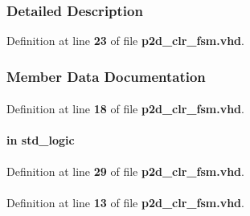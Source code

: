 \subsubsection{Detailed Description}


Definition at line {\bf 23} of file {\bf p2d\+\_\+clr\+\_\+fsm.\+vhd}.



\subsubsection{Member Data Documentation}
\paragraph[{ all }]{\hspace{0.3cm}{\ttfamily [Package]}}\label{classp2d__clr__fsm_a470a86ce8776f637b0483eabf2d92ad2}


Definition at line {\bf 18} of file {\bf p2d\+\_\+clr\+\_\+fsm.\+vhd}.

\paragraph[{clk}]{ {\bfseries \textcolor{keywordflow}{in}\textcolor{vhdlchar}{ }} {\bfseries \textcolor{comment}{std\+\_\+logic}\textcolor{vhdlchar}{ }} \hspace{0.3cm}{\ttfamily [Port]}}\label{classp2d__clr__fsm_a4a4609c199d30b3adebbeb3a01276ec5}


Definition at line {\bf 29} of file {\bf p2d\+\_\+clr\+\_\+fsm.\+vhd}.

\paragraph[{ieee}]{\hspace{0.3cm}{\ttfamily [Library]}}\label{classp2d__clr__fsm_a0a6af6eef40212dbaf130d57ce711256}


Definition at line {\bf 13} of file {\bf p2d\+\_\+clr\+\_\+fsm.\+vhd}.

